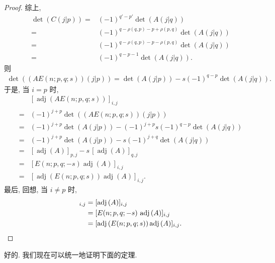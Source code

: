 \documentclass[../libro.tex]{subfiles}
\begin{document}
\begin{proof}
    综上,
    \begin{align*}
        \det {(C(j|p))}
        = {} &
        (-1)^{q' - p'} \det {(A(j|q))}
        \\
        = {} &
        (-1)^{q - \rho(q, p) - p + \rho(p, q)}
        \det {(A(j|q))}
        \\
        = {} &
        (-1)^{q - \rho(q, p) - p - \rho(p, q)}
        \det {(A(j|q))}
        \\
        = {} &
        (-1)^{q - p - 1} \det {(A(j|q))}.
    \end{align*}
    则
    \begin{align*}
        \det {((A E(n; p, q; s))(j|p))}
        = \det {(A(j|p))} - s (-1)^{q-p} \det {(A(j|q))}.
    \end{align*}
    于是, 当 \(i = p\) 时,
    \begin{align*}
        &
        [\operatorname{adj} {(A E(n; p, q; s))}]_{i,j}
        \\
        = {} &
        (-1)^{j+p}
        \det {((A E(n; p, q; s))(j|p))}
        \\
        = {} &
        (-1)^{j+p} \det {(A(j|p))}
        - (-1)^{j+p} s (-1)^{q-p} \det {(A(j|q))}
        \\
        = {} &
        (-1)^{j+p} \det {(A(j|p))}
        - s (-1)^{j+q} \det {(A(j|q))}
        \\
        = {} &
        [\operatorname{adj} {(A)}]_{p,j}
        - s\, [\operatorname{adj} {(A)}]_{q,j}
        \\
        = {} &
        [E(n; p, q; -s) \operatorname{adj} {(A)}]_{i,j}
        \\
        = {} &
        [\operatorname{adj} {(E(n; p, q; s))}
        \operatorname{adj} {(A)}]_{i,j}.
    \end{align*}
    最后, 回想, 当 \(i \neq p\) 时,
    \begin{align*}
        [\operatorname{adj} {(A E(n; p, q; s))}]_{i,j}
        = {} &
        [\operatorname{adj} {(A)}]_{i,j}
        \\
        = {} &
        [E(n; p, q; -s)\, \operatorname{adj} {(A)}]_{i,j}
        \\
        = {} &
        [\operatorname{adj} {(E(n; p, q; s))}
        \operatorname{adj} {(A)}]_{i,j}.
        \qedhere
    \end{align*}
\end{proof}

好的.
我们现在可以统一地证明下面的定理.

\end{document}
